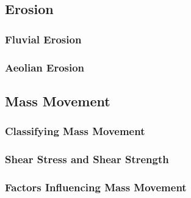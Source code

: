 \documentclass[../main]{subfiles}
\begin{document}
	\subsection{Erosion}

	\subsubsection{Fluvial Erosion}

	\subsubsection{Aeolian Erosion}

	\subsection{Mass Movement}

	\subsubsection{Classifying Mass Movement}

	\subsubsection{Shear Stress and Shear Strength}

	\subsubsection{Factors Influencing Mass Movement}
\end{document}
